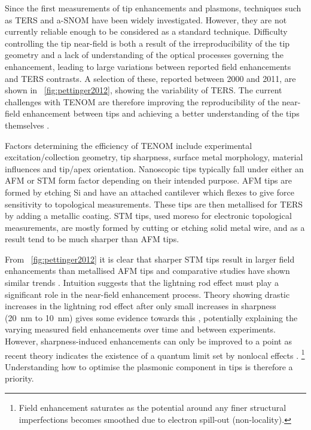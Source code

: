 \documentclass{article}
\begin{document}
Since the first measurements of tip enhancements and plasmons, techniques such as TERS and a-SNOM have been widely investigated. However, they are not currently reliable enough to be considered as a standard technique. Difficulty controlling the tip near-field is both a result of the irreproducibility of the tip geometry and a lack of understanding of the optical processes governing the enhancement, leading to large variations between reported field enhancements and TERS contrasts. A selection of these, reported between 2000 and 2011, are shown in \figurename~\ref{fig:pettinger2012}, showing the variability of TERS. The current challenges with TENOM are therefore improving the reproducibility of the near-field enhancement between tips \cite{blum2014, kumar2014, mino2014} and achieving a better understanding of the tips themselves \cite{zhang2009}.

Factors determining the efficiency of TENOM include experimental excitation/collection geometry, tip sharpness, surface metal morphology, material influences and tip/apex orientation. Nanoscopic tips typically fall under either an AFM or STM form factor depending on their intended purpose. AFM tips are formed by etching Si and have an attached cantilever which flexes to give force sensitivity to topological measurements. These tips are then metallised for TERS by adding a metallic coating. STM tips, used moreso for electronic topological measurements, are mostly formed by cutting or etching solid metal wire, and as a result tend to be much sharper than AFM tips.

From \figurename~\ref{fig:pettinger2012} it is clear that sharper STM tips result in larger field enhancements than metallised AFM tips and comparative studies have shown similar trends \cite{raschke2003, yeo2006, picardi2007}. Intuition suggests that the lightning rod effect must play a significant role in the near-field enhancement process. Theory showing drastic increases in the lightning rod effect after only small increases in sharpness (\SI{20}{nm} to \SI{10}{nm}) gives some evidence towards this \cite{zhang2009, meng2015}, potentially explaining the varying measured field enhancements over time and between experiments. However, sharpness-induced enhancements can only be improved to a point as recent theory indicates the existence of a quantum limit set by nonlocal effects \cite{wiener2012}.%
\footnote{Field enhancement saturates as the potential around any finer structural imperfections becomes smoothed due to electron spill-out (non-locality).}
Understanding how to optimise the plasmonic component in tips is therefore a priority.
\end{document}

